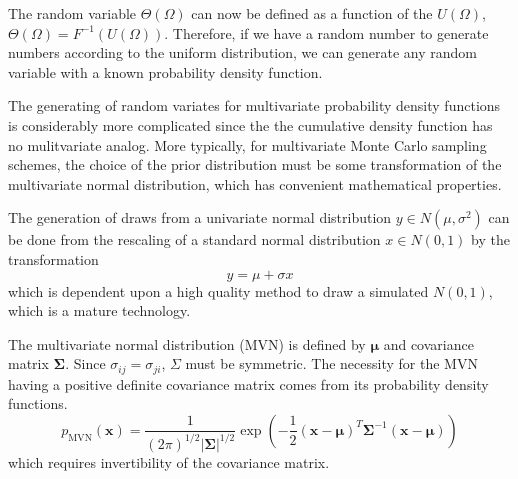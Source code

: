 The random variable $\Theta(\Omega)$ can now be defined as a function of the $U(\Omega)$, $\Theta(\Omega)=F^{-1}(U(\Omega))$.  Therefore, if we have a random number to generate numbers according to the uniform distribution, we can generate any random variable with a known probability density function.

The generating of random variates for multivariate probability density functions is considerably more complicated since the the cumulative density function has no mulitvariate analog.  More typically, for multivariate Monte Carlo sampling schemes, the choice of the prior distribution must be some transformation of the multivariate normal distribution, which has convenient mathematical properties\cite{devroye1986}.

The generation of draws from a univariate normal distribution $y \in N(\mu,\sigma^2)$ can be done from the rescaling of a standard normal distribution $x \in N(0,1)$ by the transformation
\begin{equation}
\label{eq:normal_scaling}
	  y = \mu + \sigma x
\end{equation}
which is dependent upon a high quality method to draw a simulated $N(0,1)$, which is a mature technology.

The multivariate normal distribution (MVN) is defined by $\bm{\mu}$ and covariance matrix $\bm{\Sigma}$.
Since  $\sigma_{ij}=\sigma_{ji}$, $\Sigma$ must be symmetric.  The necessity for the MVN having a positive definite covariance matrix comes from its probability density functions.
\begin{equation}
	  p_{\mathrm{MVN}}(\bm{x})
		=
		\frac{1}
		     {(2\pi)^{1/2} |\bm{\Sigma}|^{1/2} }
		\exp\left( -\frac{1}{2} (\bm{x}-\bm{\mu})^T
		                        \bm{\Sigma}^{-1}
														(\bm{x}-\bm{\mu})\right)
\end{equation}
which requires invertibility of the covariance matrix.

